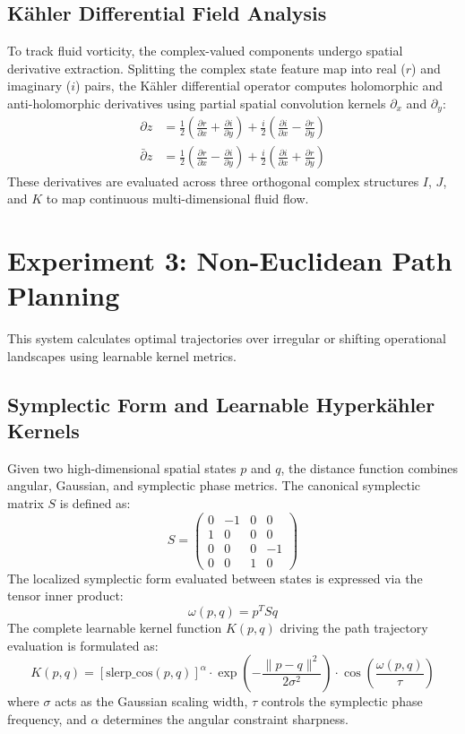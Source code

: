 \documentclass[11pt,a4paper]{article}
\begin{document}
\subsection{K\"ahler Differential Field Analysis}
To track fluid vorticity, the complex-valued components undergo spatial derivative extraction. Splitting the complex state feature map into real ($r$) and imaginary ($i$) pairs, the K\"ahler differential operator computes holomorphic and anti-holomorphic derivatives using partial spatial convolution kernels $\partial_x$ and $\partial_y$:
\begin{align}
\partial z &= \frac{1}{2} \left( \frac{\partial r}{\partial x} + \frac{\partial i}{\partial y} \right) + \frac{i}{2} \left( \frac{\partial i}{\partial x} - \frac{\partial r}{\partial y} \right) \\
\bar{\partial} z &= \frac{1}{2} \left( \frac{\partial r}{\partial x} - \frac{\partial i}{\partial y} \right) + \frac{i}{2} \left( \frac{\partial i}{\partial x} + \frac{\partial r}{\partial y} \right)
\end{align}
These derivatives are evaluated across three orthogonal complex structures $I$, $J$, and $K$ to map continuous multi-dimensional fluid flow.

\section{Experiment 3: Non-Euclidean Path Planning}
This system calculates optimal trajectories over irregular or shifting operational landscapes using learnable kernel metrics.

\subsection{Symplectic Form and Learnable Hyperk\"ahler Kernels}
Given two high-dimensional spatial states $p$ and $q$, the distance function combines angular, Gaussian, and symplectic phase metrics. The canonical symplectic matrix $S$ is defined as:
\begin{equation}
S = \begin{pmatrix} 
0 & -1 & 0 & 0 \\ 
1 & 0 & 0 & 0 \\ 
0 & 0 & 0 & -1 \\ 
0 & 0 & 1 & 0 
\end{pmatrix}
\end{equation}
The localized symplectic form evaluated between states is expressed via the tensor inner product:
\begin{equation}
\omega(p, q) = p^T S q
\end{equation}
The complete learnable kernel function $K(p,q)$ driving the path trajectory evaluation is formulated as:
\begin{equation}
K(p, q) = \left[ \text{slerp\_cos}(p, q) \right]^\alpha \cdot \exp\left( -\frac{\|p - q\|^2}{2\sigma^2} \right) \cdot \cos\left( \frac{\omega(p, q)}{\tau} \right)
\end{equation}
where $\sigma$ acts as the Gaussian scaling width, $\tau$ controls the symplectic phase frequency, and $\alpha$ determines the angular constraint sharpness.
\end{document}
